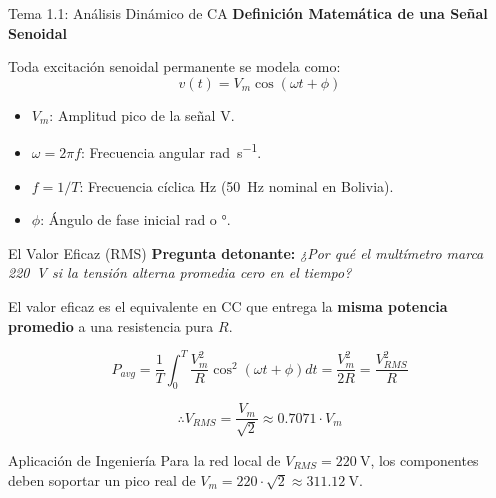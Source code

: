 \documentclass[aspectratio=169, 10pt]{beamer}
\begin{document}
\begin{frame}{Tema 1.1: Análisis Dinámico de CA}
    \textbf{Definición Matemática de una Señal Senoidal}
    
    Toda excitación senoidal permanente se modela como:
    \begin{equation*}
        v(t) = V_m \cos(\omega t + \phi)
    \end{equation*}
    
    \begin{itemize}
        \item $V_m$: Amplitud pico de la señal \unit{\volt}.
        \item $\omega = 2\pi f$: Frecuencia angular \unit{\radian\per\second}.
        \item $f = 1/T$: Frecuencia cíclica \unit{\hertz} (\SI{50}{\hertz} nominal en Bolivia).
        \item $\phi$: Ángulo de fase inicial \unit{\radian} o \unit{\degree}.
    \end{itemize}
\end{frame}

\begin{frame}{El Valor Eficaz (RMS)}
    \textbf{Pregunta detonante:} \textit{¿Por qué el multímetro marca \SI{220}{\volt} si la tensión alterna promedia cero en el tiempo?}
    
    \vspace{0.3cm}
    El valor eficaz es el equivalente en CC que entrega la \textbf{misma potencia promedio} a una resistencia pura $R$.
    
    \begin{equation*}
        P_{avg} = \frac{1}{T} \int_{0}^{T} \frac{V_m^2}{R} \cos^2(\omega t + \phi) dt = \frac{V_m^2}{2R} = \frac{V_{RMS}^2}{R}
    \end{equation*}
    
    \begin{equation*}
        \therefore V_{RMS} = \frac{V_m}{\sqrt{2}} \approx 0.7071 \cdot V_m
    \end{equation*}
    
    \begin{exampleblock}{Aplicación de Ingeniería}
        Para la red local de $V_{RMS} = \SI{220}{\volt}$, los componentes deben soportar un pico real de $V_m = 220 \cdot \sqrt{2} \approx \SI{311.12}{\volt}$.
    \end{exampleblock}
\end{frame}
\end{document}
